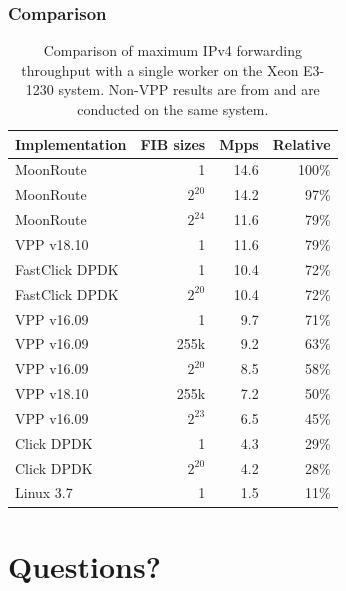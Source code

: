 \begin{frame}
    \frametitle{Comparison}
    \begin{table}
        \begin{tabular}[]{ l r r r }
            Implementation   & FIB sizes & Mpps     & Relative \\ 
            \midrule
            MoonRoute        & 1         & 14.6     & 100\% \\
            MoonRoute        & $2^{20}$  & 14.2     & 97\% \\
            MoonRoute        & $2^{24}$  & 11.6     & 79\% \\
            VPP v18.10       & 1         & 11.6     & 79\% \\
            FastClick DPDK   & 1         & 10.4     & 72\% \\
            FastClick DPDK   & $2^{20}$  & 10.4     & 72\% \\
            VPP v16.09       & 1         & 9.7      & 71\% \\
            VPP v16.09       & 255k      & 9.2      & 63\% \\
            VPP v16.09       & $2^{20}$  & 8.5      & 58\% \\
            VPP v18.10       & 255k      & 7.2      & 50\% \\
            VPP v16.09       & $2^{23}$  & 6.5      & 45\% \\
            Click DPDK       & 1         & 4.3      & 29\% \\
            Click DPDK       & $2^{20}$  & 4.2      & 28\% \\
            Linux 3.7        & 1         & 1.5      & 11\% \\

            \midrule
        \end{tabular}
        \caption{Comparison of maximum IPv4 forwarding throughput with a single worker on the Xeon E3-1230 system. Non-VPP results are from \cite{chair:architecture} and are conducted on the same system. }
        \label{table:comparison}
    \end{table}
\end{frame}



\section{Questions?}


